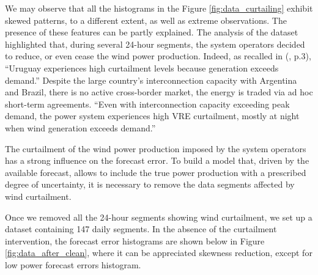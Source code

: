 \documentclass[11pt]{article}
\theoremstyle{definition}
\begin{document}
We may observe that all the histograms in the Figure \ref{fig:data_curtailing} exhibit skewed patterns, to a different extent, as well as extreme observations. The presence of these features can be partly explained. The analysis of the dataset highlighted that, during several 24-hour segments, the system operators decided to reduce, or even cease the wind power production. Indeed, as recalled in (\cite{irena2}, p.3), ``Uruguay experiences high curtailment levels because generation exceeds demand.'' Despite the large country’s interconnection capacity with Argentina and Brazil, there is no active cross-border market, the energy is traded via ad hoc short-term agreements. ``Even with interconnection capacity exceeding peak demand, the power system experiences high VRE curtailment, mostly at night when wind generation exceeds demand.''
  
The curtailment of the wind power production imposed by the system operators has a strong influence on the forecast error. To build a model that, driven by the available forecast, allows to include the true power production with a prescribed degree of uncertainty, it is necessary to remove the data segments affected by wind curtailment.

Once we removed all the 24-hour segments showing wind curtailment, we set up a dataset containing 147 daily segments. 
In the absence of the curtailment intervention, the forecast error histograms are shown below in Figure \ref{fig:data_after_clean}, where it can be appreciated skewness reduction, except for low power forecast errors histogram.
\end{document}
